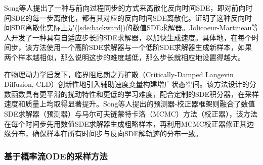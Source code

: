 \documentclass[11pt,a4paper,UTF8]{ctexart}
\begin{document}
Song等人\cite{song2020score}提出了一种与前向过程同步的方式来离散化反向时间SDE，即对前向时间SDE的每一步离散化，都有其对应的反向时间SDE离散化。\cite{song2020score}证明了这种反向时间SDE离散化实际上是(\ref{sde:backward})的数值SDE求解器。Jolicoeur-Martineau等人\cite{jolicoeur2021gotta}开发了一种具有自适应步长的SDE求解器，以加快生成速度。具体地，在每个时间步，该方法使用一个高阶SDE求解器与一个低阶SDE求解器生成新样本，如果两个样本越相似，那么说明这步的难度越低，那么步长就相应地设置得越大。

在物理动力学启发下，临界阻尼朗之万扩散（Critically-Damped Langevin Diffusion, CLD）\cite{dockhorn2021score}创新性地引入辅助速度变量构建增广状态空间。该方法设计的分数函数具有更平滑的扰动特性和更低的学习难度，配合定制的SDE积分器，在采样速度和质量上均取得显著提升。Song等人\cite{song2020score}提出的预测器-校正器框架则融合了数值SDE求解器（预测器）与马尔可夫链蒙特卡洛（MCMC）方法（校正器），该方法在每个时间步先用数值SDE求解器生成粗略样本，再利用MCMC校正器修正其边缘分布，确保样本在所有时间步与反向SDE解轨迹的分布一致。

\subsubsection{基于概率流ODE的采样方法}
\end{document}
